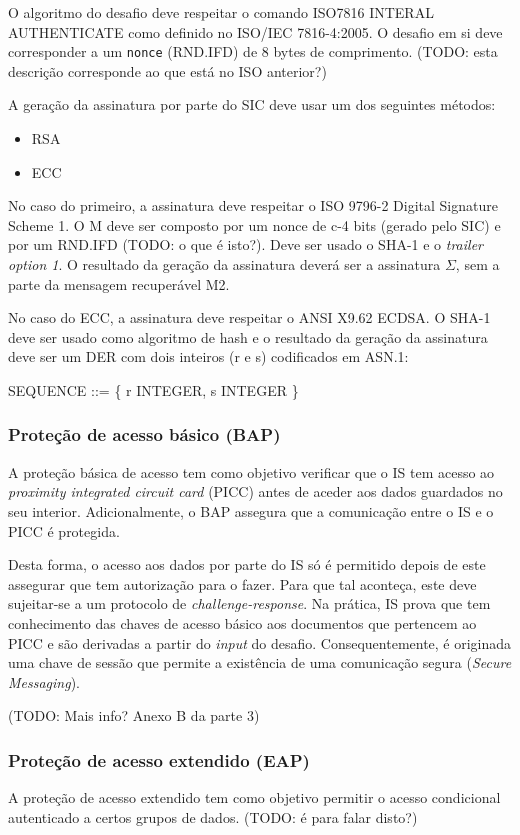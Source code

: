 O algoritmo do desafio deve respeitar o comando ISO7816 INTERAL AUTHENTICATE
como definido no ISO/IEC 7816-4:2005. O desafio em si deve corresponder a um
\texttt{nonce} (RND.IFD) de 8 bytes de comprimento. (TODO: esta descrição corresponde
ao que está no ISO anterior?)

A geração da assinatura por parte do SIC deve usar um dos seguintes métodos:
\begin{itemize}
\item RSA
\item ECC
\end{itemize}

No caso do primeiro, a assinatura deve respeitar o ISO 9796-2 Digital
Signature Scheme 1. O M deve ser composto por um nonce de c-4 bits (gerado
pelo SIC) e por um RND.IFD (TODO: o que é isto?). Deve ser usado o SHA-1 e o
\emph{trailer option 1}. O resultado da geração da assinatura deverá ser a
assinatura \(\Sigma\), sem a parte da mensagem recuperável M2.

No caso do ECC, a assinatura deve respeitar o ANSI X9.62 ECDSA. O SHA-1 deve
ser usado como algoritmo de hash e o resultado da geração da assinatura deve
ser um DER com dois inteiros (r e s) codificados em ASN.1:

SEQUENCE ::= \{ r INTEGER, s INTEGER \}

\subsubsection{Proteção de acesso básico (BAP)}
\label{sec:orgd21bd93}
A proteção básica de acesso tem como objetivo verificar que o IS tem acesso
ao \emph{proximity integrated circuit card} (PICC) antes de aceder aos dados
guardados no seu interior. Adicionalmente, o BAP assegura que a comunicação
entre o IS e o PICC é protegida. 

Desta forma, o acesso aos dados por parte do IS só é permitido depois de
este assegurar que tem autorização para o fazer. Para que tal aconteça, este
deve sujeitar-se a um protocolo de \emph{challenge-response}. Na prática, IS prova
que tem conhecimento das chaves de acesso básico aos documentos que
pertencem ao PICC e são derivadas a partir do \emph{input} do desafio.
Consequentemente, é originada uma chave de sessão que permite a existência
de uma comunicação segura (\emph{Secure Messaging}).

(TODO: Mais info? Anexo B da parte 3)

\subsubsection{Proteção de acesso extendido (EAP)}
\label{sec:org6117d54}
A proteção de acesso extendido tem como objetivo permitir o acesso
condicional autenticado a certos grupos de dados.
(TODO: é para falar disto?)
